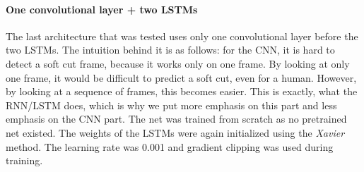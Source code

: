 \paragraph{One convolutional layer + two LSTMs}
The last architecture that was tested uses only one convolutional layer before the two LSTMs.
The intuition behind it is as follows: for the CNN, it is hard to detect a soft cut frame, because it works only on one frame.
By looking at only one frame, it would be difficult to predict a soft cut, even for a human.
However, by looking at a sequence of frames, this becomes easier.
This is exactly, what the RNN/LSTM does, which is why we put more emphasis on this part and less emphasis on the CNN part.
The net was trained from scratch as no pretrained net existed.
The weights of the LSTMs were again initialized using the \textit{Xavier} method.
The learning rate was 0.001 and gradient clipping was used during training.

